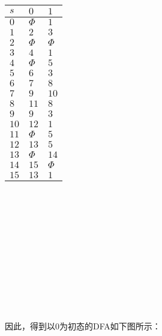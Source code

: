 \documentclass{article}
\begin{document}
\begin{table}[h!]
    \centering
\begin{tabular}{|p{3cm}<{\centering}|p{3cm}<{\centering}|p{3cm}<{\centering}|}   
    \hline
    $s$ & $0$ & $1$ \\
    \hline
    $0$ & $\Phi$ & $1$ \\
    \hline
    $1$ & $2$ & $3$ \\
    \hline
    $2$ & $\Phi$ & $\Phi$ \\
    \hline
    $3$ & $4$ & $1$ \\
    \hline
    $4$ & $\Phi$ & $5$ \\
    \hline
    $5$ & $6$ & $3$ \\
    \hline
    $6$ & $7$ & $8$ \\
    \hline
    $7$ & $9$ & $10$ \\
    \hline
    $8$ & $11$ & $8$ \\
    \hline
    $9$ & $9$ & $3$ \\
    \hline
    $10$ & $12$ & $1$ \\
    \hline
    $11$ & $\Phi$ & $5$ \\
    \hline
    $12$ & $13$ & $5$ \\
    \hline
    $13$ & $\Phi$ & $14$ \\
    \hline
    $14$ & $15$ & $\Phi$ \\
    \hline
    $15$ & $13$ & $1$ \\
    \hline
\end{tabular}
\end{table}
\ \\ \\ \\ \\ \\ \\ \\ \\ \\ \\ \\
因此，得到以0为初态的DFA如下图所示：
\end{document}
